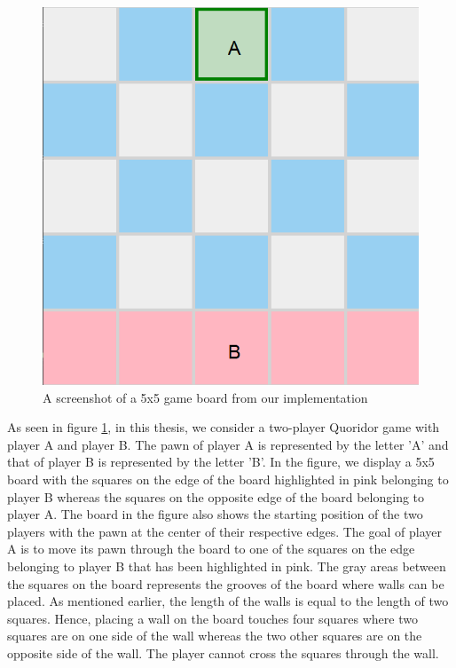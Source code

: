 \begin{figure}[!ht]
    \centering
    \includegraphics[scale=0.25]{../img/GameBoard/initial.png}
    \caption{A screenshot of a 5x5 game board from our implementation}
    \label{fig:InitialGameBoard}
\end{figure}

As seen in figure \ref{fig:InitialGameBoard}, in this thesis, we consider a two-player Quoridor game with player A and player B. The pawn of player A is represented by the letter 'A' and that of player B is represented by the letter 'B'. In the figure, we display a 5x5 board with the squares on the edge of the board highlighted in pink belonging to player B whereas the squares on the opposite edge of the board belonging to player A. The board in the figure also shows the starting position of the two players with the pawn at the center of their respective edges. The goal of player A is to move its pawn through the board to one of the squares on the edge belonging to player B that has been highlighted in pink. The gray areas between the squares on the board represents the grooves of the board where walls can be placed. As mentioned earlier, the length of the walls is equal to the length of two squares. Hence, placing a wall on the board touches four squares where two squares are on one side of the wall whereas the two other squares are on the opposite side of the wall. The player cannot cross the squares through the wall. 

